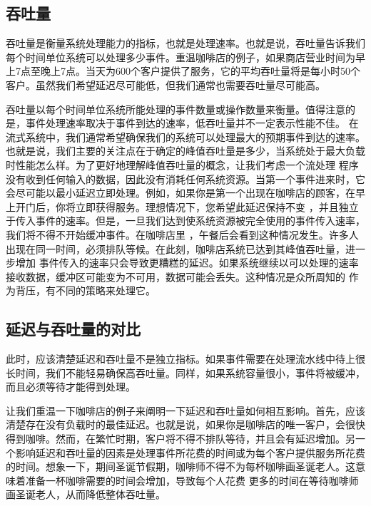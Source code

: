 \documentclass[cn,11pt,chinese]{elegantbook}
\begin{document}
\hypertarget{ux541eux5410ux91cf}{%
\subsection{吞吐量}\label{ux541eux5410ux91cf}}

吞吐量是衡量系统处理能力的指标，也就是处理速率。也就是说，吞吐量告诉我们每个时间单位系统可以处理多少事件。重温咖啡店的例子，如果商店营业时间为早上7点至晚上7点。当天为600个客户提供了服务，它的平均吞吐量将是每小时50个客户。虽然我们希望延迟尽可能低，但我们通常也需要吞吐量尽可能高。

吞吐量以每个时间单位系统所能处理的事件数量或操作数量来衡量。值得注意的是，事件处理速率取决于事件到达的速率，低吞吐量并不一定表示性能不佳。
在流式系统中，我们通常希望确保我们的系统可以处理最大的预期事件到达的速率。也就是说，我们主要的关注点在于确定的峰值吞吐量是多少，当系统处于最大负载时性能怎么样。为了更好地理解峰值吞吐量的概念，让我们考虑一个流处理
程序没有收到任何输入的数据，因此没有消耗任何系统资源。当第一个事件进来时，它会尽可能以最小延迟立即处理。例如，如果你是第一个出现在咖啡店的顾客，在早上开门后，你将立即获得服务。理想情况下，您希望此延迟保持不变
，并且独立于传入事件的速率。但是，一旦我们达到使系统资源被完全使用的事件传入速率，我们将不得不开始缓冲事件。在咖啡店里
，午餐后会看到这种情况发生。许多人出现在同一时间，必须排队等候。在此刻，咖啡店系统已达到其峰值吞吐量，进一步增加
事件传入的速率只会导致更糟糕的延迟。如果系统继续以可以处理的速率接收数据，缓冲区可能变为不可用，数据可能会丢失。这种情况是众所周知的
作为背压，有不同的策略来处理它。

\hypertarget{ux5ef6ux8fdfux4e0eux541eux5410ux91cfux7684ux5bf9ux6bd4}{%
\subsection{延迟与吞吐量的对比}\label{ux5ef6ux8fdfux4e0eux541eux5410ux91cfux7684ux5bf9ux6bd4}}

此时，应该清楚延迟和吞吐量不是独立指标。如果事件需要在处理流水线中待上很长时间，我们不能轻易确保高吞吐量。同样，如果系统容量很小，事件将被缓冲，而且必须等待才能得到处理。

让我们重温一下咖啡店的例子来阐明一下延迟和吞吐量如何相互影响。首先，应该清楚存在没有负载时的最佳延迟。也就是说，如果你是咖啡店的唯一客户，会很快得到咖啡。然而，在繁忙时期，客户将不得不排队等待，并且会有延迟增加。另一个影响延迟和吞吐量的因素是处理事件所花费的时间或为每个客户提供服务所花费的时间。想象一下，期间圣诞节假期，咖啡师不得不为每杯咖啡画圣诞老人。这意味着准备一杯咖啡需要的时间会增加，导致每个人花费
更多的时间在等待咖啡师画圣诞老人，从而降低整体吞吐量。
\end{document}
